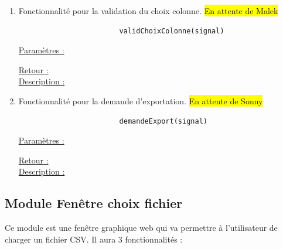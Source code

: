 \begin{enumerate}
				\vspace{1em}\item Fonctionnalité pour la validation du choix colonne. \colorbox{yellow}{En attente de Malek}
					\begin{lstlisting}
						validChoixColonne(signal)
					\end{lstlisting}
					\underline{Paramètres :}
						\begin{description}[style=unboxed,leftmargin=0.2cm]
							\item \lstinline!signal! : 
						\end{description}
					\underline{Retour :} \\
					\underline{Description :} 
					
				\vspace{1em}\item Fonctionnalité pour la demande d'exportation. \colorbox{yellow}{En attente de Sonny}
					\begin{lstlisting}
						demandeExport(signal)
					\end{lstlisting}
					\underline{Paramètres :}
						\begin{description}[style=unboxed,leftmargin=0.2cm]
							\item \lstinline!signal! : 
						\end{description}
					\underline{Retour :} \\
					\underline{Description :} 
										
					\end{enumerate}
		
		\subsection{Module Fenêtre choix fichier}
		Ce module est une fenêtre graphique web qui va permettre à l'utilisateur de charger un fichier CSV. Il aura 3 fonctionnalités :

